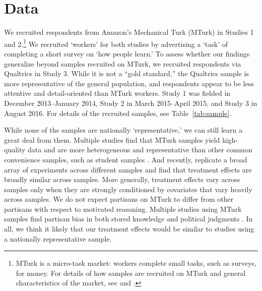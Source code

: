 \documentclass[12pt,letterpaper]{article}
\begin{document}
\section*{Data}

We recruited respondents from Amazon's Mechanical Turk (MTurk) in Studies 1 and 2.\footnote{MTurk is a micro-task market: workers complete small tasks, such as surveys, for money. For details of how samples are recruited on MTurk and general characteristics of the market, see \citet{buhrmester2011} and \citet{berinsky2012}.} We recruited `workers' for both studies by advertising a `task' of completing a short survey on `how people learn.' To assess whether our findings generalize beyond samples recruited on MTurk, we recruited respondents via Qualtrics in Study 3.
While it is not a ``gold standard,'' the Qualtrics sample is more representative of the general population, and respondents appear to be less attentive and detail-oriented than MTurk workers.
Study 1 was fielded in December 2013--January 2014, Study 2 in March 2015--April 2015, and Study 3 in August 2016.
For details of the recruited samples, see Table~\ref{tab:sample}.

While none of the samples are nationally `representative,' we can still learn a great deal from them. Multiple studies find that MTurk samples yield high-quality data and are more heterogeneous and representative than other common convenience samples, such as student samples \citep{buhrmester2011, berinsky2012, paolacci2014}. And recently, \citet{mullinix2015} replicate a broad array of experiments across different samples and find that treatment effects are broadly similar across samples. More generally, treatment effects vary across samples only when they are strongly conditioned by covariates that vary heavily across samples. We do not expect partisans on MTurk to differ from other partisans with respect to motivated reasoning. Multiple studies using MTurk samples find partisan bias in both stored knowledge \citep[e.g.,][]{chambers2014, ahler2015, chambers2015, bullock2015} and political judgments \citep[e.g.,][]{arceneaux2013, lyons2014, crawford2015a, crawford2015b, thibodeau2015}. In all, we think it likely that our treatment effects would be similar to studies using a nationally representative sample. 
\end{document}
